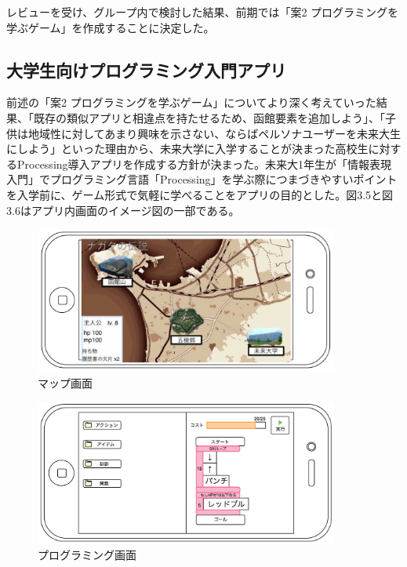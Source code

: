 \documentclass[openany,11pt,papersize]{jsbook}
\begin{document}
 \par レビューを受け、グループ内で検討した結果、前期では「案2 プログラミングを学ぶゲーム」を作成することに決定した。
 
 
 \subsection{大学生向けプログラミング入門アプリ}
\par 前述の「案2 プログラミングを学ぶゲーム」についてより深く考えていった結果、「既存の類似アプリと相違点を持たせるため、函館要素を追加しよう」、「子供は地域性に対してあまり興味を示さない、ならばペルソナユーザーを未来大生にしよう」といった理由から、未来大学に入学することが決まった高校生に対するProcessing導入アプリを作成する方針が決まった。未来大1年生が「情報表現入門」でプログラミング言語「Processing」を学ぶ際につまづきやすいポイントを入学前に、ゲーム形式で気軽に学べることをアプリの目的とした。図3.5と図3.6はアプリ内画面のイメージ図の一部である。

\begin{figure}[H]
\begin{center}
\includegraphics[width=10cm, bb=0 0 1182 571]{img/LengedOfN_map.png}
\end{center}
\caption{マップ画面}
\end{figure}

\begin{figure}[H]
\begin{center}
\includegraphics[width=10cm, bb=0 0 1173 563]{img/LegendOfN_programming.png}
\end{center}
\caption{プログラミング画面}
\end{figure}
\end{document}
